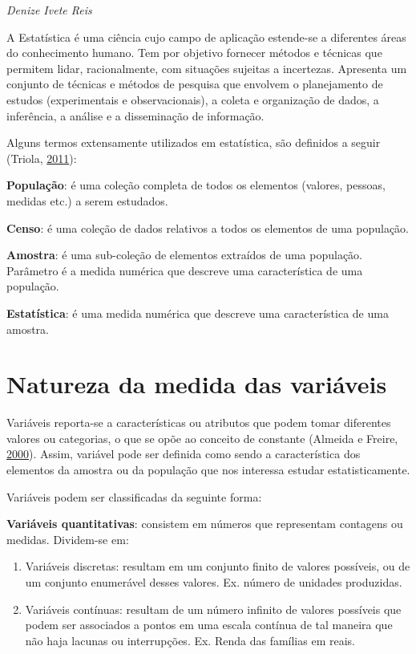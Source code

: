 \documentclass[12pt,brazil,oneside]{book}
\begin{document}
\emph{Denize Ivete Reis}

\begin{flushright}
\emph{}
\end{flushright}

A Estatística é uma ciência cujo campo de aplicação estende-se a diferentes áreas do conhecimento humano. Tem por objetivo fornecer métodos e técnicas que permitem lidar, racionalmente, com situações sujeitas a incertezas. Apresenta um conjunto de técnicas e métodos de pesquisa que envolvem o planejamento de estudos (experimentais e observacionais), a coleta e organização de dados, a inferência, a análise e a disseminação de informação.

Alguns termos extensamente utilizados em estatística, são definidos a seguir (Triola, \protect\hyperlink{ref-triola1999}{2011}):

\textbf{População}: é uma coleção completa de todos os elementos (valores, pessoas, medidas etc.) a serem estudados.

\textbf{Censo}: é uma coleção de dados relativos a todos os elementos de uma população.

\textbf{Amostra}: é uma sub-coleção de elementos extraídos de uma população.
Parâmetro é a medida numérica que descreve uma característica de uma população.

\textbf{Estatística}: é uma medida numérica que descreve uma característica de uma amostra.

\hypertarget{natureza-da-medida-das-variaveis}{%
\section{Natureza da medida das variáveis}\label{natureza-da-medida-das-variaveis}}

Variáveis reporta-se a características ou atributos que podem tomar diferentes valores ou categorias, o que se opõe ao conceito de constante (Almeida e Freire, \protect\hyperlink{ref-almeida2000}{2000}). Assim, variável pode ser definida como sendo a característica dos elementos da amostra ou da população que nos interessa estudar estatisticamente.

Variáveis podem ser classificadas da seguinte forma:

\textbf{Variáveis quantitativas}: consistem em números que representam contagens ou medidas. Dividem-se em:

\begin{enumerate}
\def\labelenumi{\alph{enumi})}
\item
  Variáveis discretas: resultam em um conjunto finito de valores possíveis, ou de um conjunto enumerável desses valores. Ex. número de unidades produzidas.
\item
  Variáveis contínuas: resultam de um número infinito de valores possíveis que podem ser associados a pontos em uma escala contínua de tal maneira que não haja lacunas ou interrupções. Ex. Renda das famílias em reais.
\end{enumerate}
\end{document}
